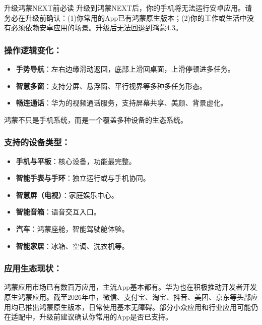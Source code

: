 \begin{tcbwarn}{升级鸿蒙NEXT前必读}
升级到鸿蒙NEXT后，你的手机将无法运行安卓应用。请务必在升级前确认：(1)你常用的App已有鸿蒙原生版本；(2)你的工作或生活中没有必须依赖安卓应用的场景。升级后无法回退到鸿蒙4.3。

\end{tcbwarn}

\subsubsection*{操作逻辑变化：}

\begin{itemize}
  \item \textbf{手势导航}：左右边缘滑动返回，底部上滑回桌面，上滑停顿进多任务。
  \item \textbf{智慧多窗}：支持分屏、悬浮窗、平行视界等多种多任务形态。
  \item \textbf{畅连通话}：华为的视频通话服务，支持屏幕共享、美颜、背景虚化。
\end{itemize}


鸿蒙不只是手机系统，而是一个覆盖多种设备的生态系统。

\subsubsection*{支持的设备类型：}

\begin{itemize}
  \item \textbf{手机与平板}：核心设备，功能最完整。
  \item \textbf{智能手表与手环}：独立运行或与手机协同。
  \item \textbf{智慧屏（电视）}：家庭娱乐中心。
  \item \textbf{智能音箱}：语音交互入口。
  \item \textbf{汽车}：鸿蒙座舱，智能驾驶舱体验。
  \item \textbf{智能家居}：冰箱、空调、洗衣机等。
\end{itemize}

\subsubsection*{应用生态现状：}

鸿蒙应用市场已有数百万应用，主流App基本都有。华为也在积极推动开发者开发原生鸿蒙应用。截至2026年中，微信、支付宝、淘宝、抖音、美团、京东等头部应用均已推出鸿蒙原生版本，日常使用基本无障碍。部分小众应用和行业应用可能仍在适配中，升级前建议确认你常用的App是否已支持。

